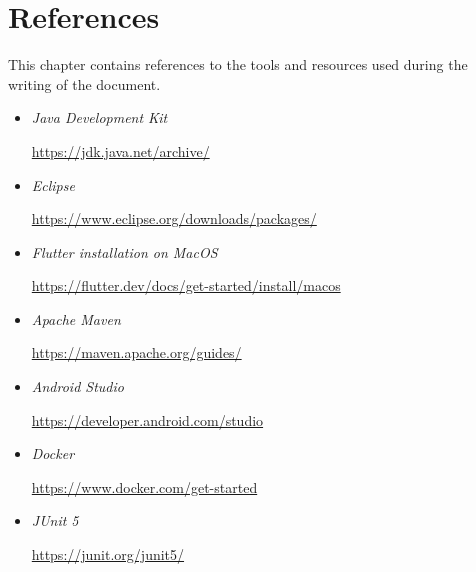 \documentclass[a4paper,oneside,11pt]{book}
\begin{document}
    
\chapter{References}
    This chapter contains references to the tools and resources used during the writing of the document. \par
    \begin{itemize}
        \item \textit{Java Development Kit} 
        
        \url{https://jdk.java.net/archive/}
        \item \textit{Eclipse} 
        
        \url{https://www.eclipse.org/downloads/packages/}
        \item \textit{Flutter installation on MacOS} 
        
        \url{https://flutter.dev/docs/get-started/install/macos}
        \item \textit{Apache Maven} 
        
        \url{https://maven.apache.org/guides/}
        \item \textit{Android Studio}
        
        \url{https://developer.android.com/studio}
        \item \textit{Docker}
        
        \url{https://www.docker.com/get-started}
        
        \item \textit{JUnit 5} 
        
        \url{https://junit.org/junit5/}
    \end{itemize}

\listoftables
\listoffigures
\end{document}
